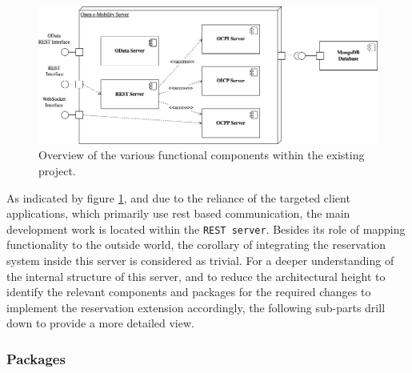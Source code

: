 \begin{figure}[h]
    \centering
    \includegraphics[scale=0.4]{resources/images/main/6_implementation/DeploymentView.png}
    \caption{Overview of the various functional components within the existing project.}
    \label{fig:module-view}
\end{figure}

\noindent As indicated by figure \ref{fig:module-view}, and due to the reliance of the targeted client applications, which primarily use \acrshort{rest} based communication, the main development work is located within the \texttt{REST server}. 
Besides its role of mapping functionality to the outside world, the corollary of integrating the reservation system inside this server is considered as trivial.
For a deeper understanding of the internal structure of this server, and to reduce the architectural height to identify the relevant components and packages for the required changes to implement the reservation extension accordingly, the following sub-parts drill down to provide a more detailed view.

\subsubsection{Packages}
\label{ch:Implementation:sec:Reservation System:ssec:Architectural Views:sssec:Packages}

